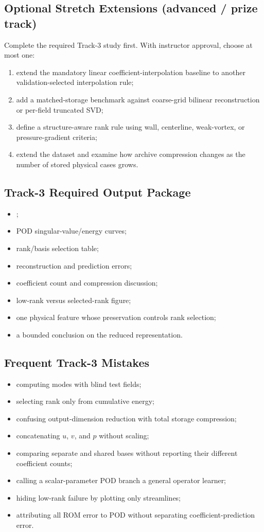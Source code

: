 \documentclass[11pt]{article}
\newcommand{\file}[1]{\path{#1}}
\begin{document}
\subsection{Optional Stretch Extensions (advanced / prize track)}
Complete the required Track-3 study first. With instructor approval, choose at most one:
\begin{enumerate}
\item extend the mandatory linear coefficient-interpolation baseline to another validation-selected interpolation rule;
\item add a matched-storage benchmark against coarse-grid bilinear reconstruction or per-field truncated SVD;
\item define a structure-aware rank rule using wall, centerline, weak-vortex, or pressure-gradient criteria;
\item extend the dataset and examine how archive compression changes as the number of stored physical cases grows.
\end{enumerate}

\subsection{Track-3 Required Output Package}
\begin{itemize}
\item \file{P3_results.csv};
\item POD singular-value/energy curves;
\item rank/basis selection table;
\item reconstruction and prediction errors;
\item coefficient count and compression discussion;
\item low-rank versus selected-rank figure;
\item one physical feature whose preservation controls rank selection;
\item a bounded conclusion on the reduced representation.
\end{itemize}

\subsection{Frequent Track-3 Mistakes}
\begin{itemize}
\item computing modes with blind test fields;
\item selecting rank only from cumulative energy;
\item confusing output-dimension reduction with total storage compression;
\item concatenating $u$, $v$, and $p$ without scaling;
\item comparing separate and shared bases without reporting their different coefficient counts;
\item calling a scalar-parameter POD branch a general operator learner;
\item hiding low-rank failure by plotting only streamlines;
\item attributing all ROM error to POD without separating coefficient-prediction error.
\end{itemize}
\end{document}
